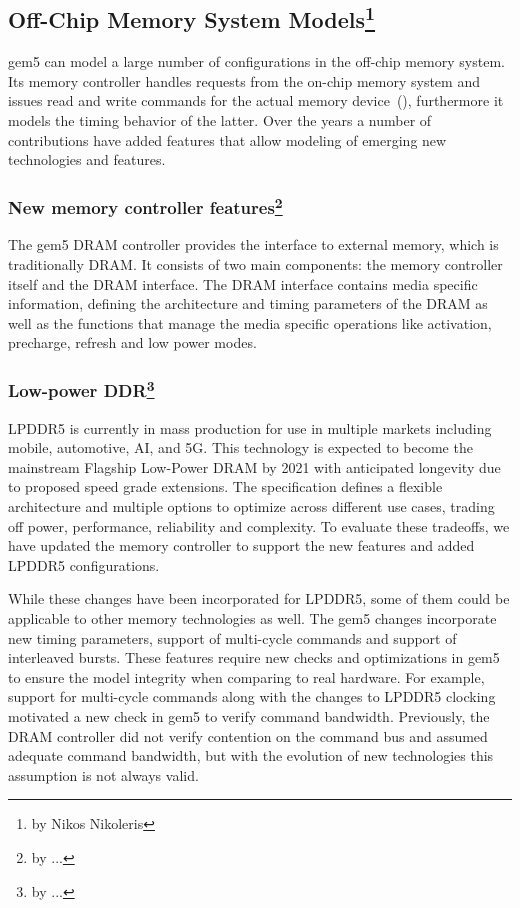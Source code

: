 \subsection[Off-Chip Memory System Models]{Off-Chip Memory System Models\footnote{by Nikos Nikoleris}}

gem5 can model a large number of configurations in the off-chip memory system.
Its memory controller handles requests from the on-chip memory system and issues read and write commands for the actual memory device~\cite{}(), furthermore it models the timing behavior of the latter.
Over the years a number of contributions have added features that allow modeling of emerging new technologies and features.

\subsubsection[New memory controller features]{New memory controller features\footnote{by ...}}

The gem5 DRAM controller provides the interface to external memory, which is traditionally DRAM.
It consists of two main components: the memory controller itself and the DRAM interface.
The DRAM interface contains media specific information, defining the architecture and timing parameters of the DRAM as well as the functions that manage the media specific operations like activation, precharge, refresh and low power modes.

\subsubsection[Low-power DDR]{Low-power DDR\footnote{by ...}}

LPDDR5 is currently in mass production for use in multiple markets including mobile, automotive, AI, and 5G.
This technology is expected to become the mainstream Flagship Low-Power DRAM by 2021 with anticipated longevity due to proposed speed grade extensions.
The specification defines a flexible architecture and multiple options to optimize across different use cases, trading off power, performance, reliability and complexity.
To evaluate these tradeoffs, we have updated the memory controller to support the new features and added LPDDR5 configurations.

While these changes have been incorporated for LPDDR5, some of them could be applicable to other memory technologies as well.
The gem5 changes incorporate new timing parameters, support of multi-cycle commands and support of interleaved bursts.
These features require new checks and optimizations in gem5 to ensure the model integrity when comparing to real hardware.
For example, support for multi-cycle commands along with the changes to LPDDR5 clocking motivated a new check in gem5 to verify command bandwidth.
Previously, the DRAM controller did not verify contention on the command bus and assumed adequate command bandwidth, but with the evolution of new technologies this assumption is not always valid.


